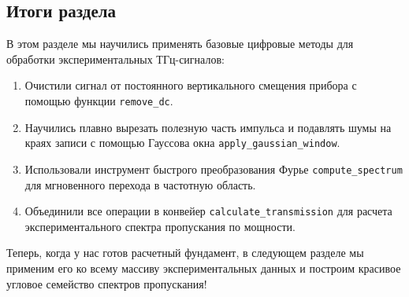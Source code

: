 \subsection{Итоги раздела}
В этом разделе мы научились применять базовые цифровые методы для обработки экспериментальных ТГц-сигналов:
\begin{enumerate}
	\item Очистили сигнал от постоянного вертикального смещения прибора с помощью функции \texttt{remove\_dc}.
	\item Научились плавно вырезать полезную часть импульса и подавлять шумы на краях записи с помощью Гауссова окна \texttt{apply\_gaussian\_window}.
	\item Использовали инструмент быстрого преобразования Фурье \texttt{compute\_spectrum} для мгновенного перехода в частотную область.
	\item Объединили все операции в конвейер \texttt{calculate\_transmission} для расчета экспериментального спектра пропускания по мощности.
\end{enumerate}

Теперь, когда у нас готов расчетный фундамент, в следующем разделе мы применим его ко всему массиву экспериментальных данных и построим красивое угловое семейство спектров пропускания!
